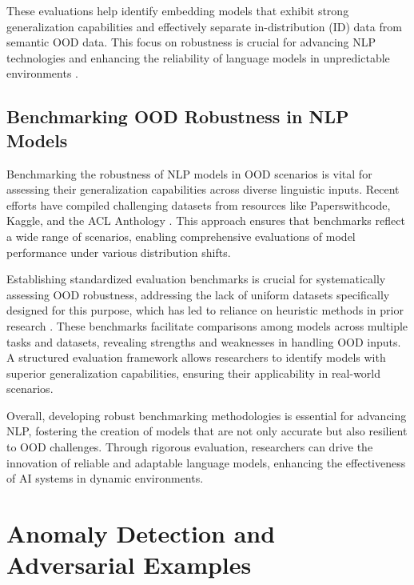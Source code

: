 These evaluations help identify embedding models that exhibit strong generalization capabilities and effectively separate in-distribution (ID) data from semantic OOD data. This focus on robustness is crucial for advancing NLP technologies and enhancing the reliability of language models in unpredictable environments \cite{wang2024bridgingooddetectiongeneralization,darrin2024embeddingmodelpromisinganother}.

\subsection{Benchmarking OOD Robustness in NLP Models} \label{subsec:Benchmarking OOD Robustness in NLP Models}

Benchmarking the robustness of NLP models in OOD scenarios is vital for assessing their generalization capabilities across diverse linguistic inputs. Recent efforts have compiled challenging datasets from resources like Paperswithcode, Kaggle, and the ACL Anthology \cite{yuan2023revisiting}. This approach ensures that benchmarks reflect a wide range of scenarios, enabling comprehensive evaluations of model performance under various distribution shifts.

Establishing standardized evaluation benchmarks is crucial for systematically assessing OOD robustness, addressing the lack of uniform datasets specifically designed for this purpose, which has led to reliance on heuristic methods in prior research \cite{yuan2023revisiting}. These benchmarks facilitate comparisons among models across multiple tasks and datasets, revealing strengths and weaknesses in handling OOD inputs. A structured evaluation framework allows researchers to identify models with superior generalization capabilities, ensuring their applicability in real-world scenarios.

Overall, developing robust benchmarking methodologies is essential for advancing NLP, fostering the creation of models that are not only accurate but also resilient to OOD challenges. Through rigorous evaluation, researchers can drive the innovation of reliable and adaptable language models, enhancing the effectiveness of AI systems in dynamic environments.










\section{Anomaly Detection and Adversarial Examples} \label{sec:Anomaly Detection and Adversarial Examples}

